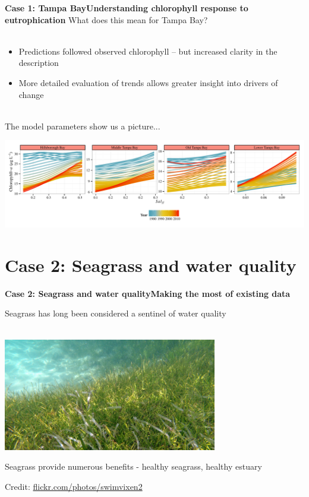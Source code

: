 \documentclass[serif]{beamer}\usepackage[]{graphicx}\usepackage[]{color}
\begin{document}
\begin{frame}{\textbf{Case 1: Tampa Bay}}{\textbf{Understanding chlorophyll response to eutrophication}}
\onslide<+->
What does this mean for Tampa Bay?\\~\\
\begin{itemize}
\item Predictions followed observed chlorophyll -- but increased clarity in the description
\item More detailed evaluation of trends allows greater insight into drivers of change\\~\\
\end{itemize}
\onslide<+->
The model parameters show us a picture...
\centerline{\includegraphics[width = \textwidth]{fig/title_plo.pdf}}
\end{frame}

\section{Case 2: Seagrass and water quality}

\begin{frame}{\textbf{Case 2: Seagrass and water quality}}{\textbf{Making the most of existing data}}
\begin{center}
Seagrass has long been considered a sentinel of water quality \\~\\
\centerline{\includegraphics[width = 0.7\textwidth]{fig/sg_pic.png}}
\vspace{0.1in}
Seagrass provide numerous benefits - healthy seagrass, healthy estuary
\end{center}
\vfill
\tiny
\hfill Credit: \href{https://www.flickr.com/photos/swimvixen2/3581613875/in/photostream/}{flickr.com/photos/swimvixen2}
\end{frame}
\end{document}
